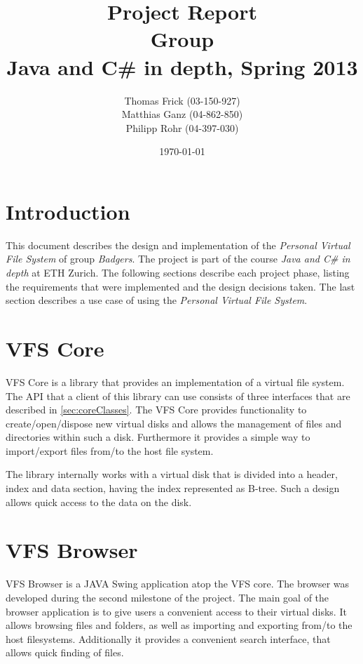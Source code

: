 \documentclass[a4paper,12pt]{article}
\title{
Project Report \\ 
Group \groupname \\
\vspace{5mm}
\large Java and C\# in depth, Spring 2013
}
\author{
Thomas Frick (03-150-927)\\
Matthias Ganz (04-862-850)\\
Philipp Rohr (04-397-030)
}
\date{\today}
\newcommand{\groupname}{Badgers\xspace}
\begin{document}
\maketitle


\section{Introduction}

This document describes the design and implementation of the \emph{Personal
Virtual File System} of group \emph{\groupname}. The project is part of the
course \emph{Java and C\# in depth} at ETH Zurich. The following sections
describe each project phase, listing the requirements that were implemented and
the design decisions taken. The last section describes a use case of using the
\emph{Personal Virtual File System}.


\section{VFS Core}

VFS Core is a library that provides an implementation of a virtual file system.
The API that a client of this library can use consists of three interfaces that
are described in \ref{sec:coreClasses}. The VFS Core provides functionality to
create/open/dispose new virtual disks and allows the management of files and
directories within such a disk. Furthermore it provides a simple way to
import/export files from/to the host file system.

The library internally works with a virtual disk that is divided into a header,
index and data section, having the index represented as B-tree. Such a design
allows quick access to the data on the disk.







\section{VFS Browser}

VFS Browser is a JAVA Swing application atop the VFS core. The browser was
developed during the second milestone of the project. The main goal of the
browser application is to give users a convenient access to their virtual disks.
It allows browsing files and folders, as well as importing and
exporting from/to the host filesystems. Additionally it provides a convenient
search interface, that allows quick finding of files.
\end{document}
